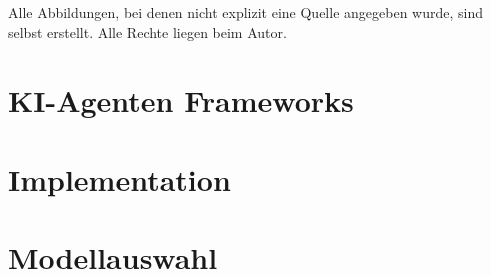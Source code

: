 

\setlength{\headheight}{27.35pt} %
\setlength{\footheight}{18.85pt}  %
\setlength{\footskip}{30pt}        %

% 
\pagestyle{empty}



\newpage
\pagestyle{scrheadings}
\thispagestyle{firstPage}
\tableofcontents
\newpage
\thispagestyle{firstPage}
\listoffigures
Alle Abbildungen, bei denen nicht explizit eine Quelle angegeben wurde, sind selbst erstellt. Alle Rechte liegen beim Autor.
\newpage
\thispagestyle{firstPage}
\lstlistoflistings
\newpage
\thispagestyle{firstPage}
\listoftables  
\newpage
\setcounter{page}{1}
\section{KI-Agenten Frameworks}

\section{Implementation}

\section{Modellauswahl}

\newpage
\printbibliography
\thispagestyle{firstPage}
\appendix

